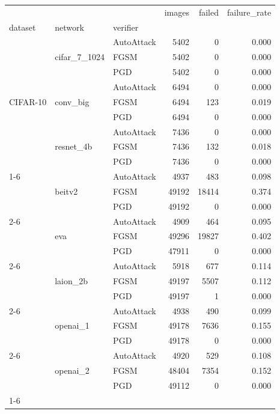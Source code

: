 \begin{tabular}{lllrrr}
\toprule
 &  &  & images & failed & failure\_rate \\
dataset & network & verifier &  &  &  \\
\midrule
\multirow[t]{9}{*}{CIFAR-10} & \multirow[t]{3}{*}{cifar\_7\_1024} & AutoAttack & 5402 & 0 & 0.000 \\
 &  & FGSM & 5402 & 0 & 0.000 \\
 &  & PGD & 5402 & 0 & 0.000 \\
\cline{2-6}
 & \multirow[t]{3}{*}{conv\_big} & AutoAttack & 6494 & 0 & 0.000 \\
 &  & FGSM & 6494 & 123 & 0.019 \\
 &  & PGD & 6494 & 0 & 0.000 \\
\cline{2-6}
 & \multirow[t]{3}{*}{resnet\_4b} & AutoAttack & 7436 & 0 & 0.000 \\
 &  & FGSM & 7436 & 132 & 0.018 \\
 &  & PGD & 7436 & 0 & 0.000 \\
\cline{1-6} \cline{2-6}
\multirow[t]{15}{*}{ImageNet} & \multirow[t]{3}{*}{beitv2} & AutoAttack & 4937 & 483 & 0.098 \\
 &  & FGSM & 49192 & 18414 & 0.374 \\
 &  & PGD & 49192 & 0 & 0.000 \\
\cline{2-6}
 & \multirow[t]{3}{*}{eva} & AutoAttack & 4909 & 464 & 0.095 \\
 &  & FGSM & 49296 & 19827 & 0.402 \\
 &  & PGD & 47911 & 0 & 0.000 \\
\cline{2-6}
 & \multirow[t]{3}{*}{laion\_2b} & AutoAttack & 5918 & 677 & 0.114 \\
 &  & FGSM & 49197 & 5507 & 0.112 \\
 &  & PGD & 49197 & 1 & 0.000 \\
\cline{2-6}
 & \multirow[t]{3}{*}{openai\_1} & AutoAttack & 4938 & 490 & 0.099 \\
 &  & FGSM & 49178 & 7636 & 0.155 \\
 &  & PGD & 49178 & 0 & 0.000 \\
\cline{2-6}
 & \multirow[t]{3}{*}{openai\_2} & AutoAttack & 4920 & 529 & 0.108 \\
 &  & FGSM & 48404 & 7354 & 0.152 \\
 &  & PGD & 49112 & 0 & 0.000 \\
\cline{1-6} \cline{2-6}
\bottomrule
\end{tabular}
